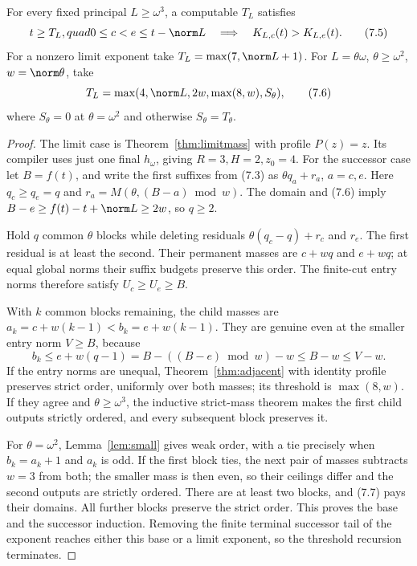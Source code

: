 \documentclass[11pt,a4paper]{article}
\newcommand{\KK}[2]{K_{#1,#2}}
\begin{document}
\begin{theorem}\label{thm:mass}
For every fixed principal $L\ge\omega^3$, a computable $T_L$ satisfies
\[
 t\ge T_L,quad0\le c<e\le t-\norm L
                 \quad\Longrightarrow\quad\KK Lc(t)>\KK Le(t). \tag{7.5}
\]
For a nonzero limit exponent take $T_L=\max(7,\norm L+1)$.
For $L=\theta\omega$, $\theta\ge\omega^2$, $w=\norm\theta$, take
\[
 T_L=\max(4,\norm L,2w,\max(8,w),S_\theta),          \tag{7.6}
\]
where $S_\theta=0$ at $\theta=\omega^2$ and otherwise $S_\theta=T_\theta$.
\end{theorem}
\begin{proof}
The limit case is Theorem~\ref{thm:limitmass} with profile $P(z)=z$.
Its compiler uses just one final $h_\omega$, giving $R=3,H=2,z_0=4$.
For the successor case let $B=f(t)$, and write the first suffixes from
(7.3) as $\theta q_a+r_a$, $a=c,e$. Here $q_c\ge q_e=q$ and
$r_a=M(\theta,(B-a)\bmod w)$. The domain and (7.6) imply
$B-e\ge f(t)-t+\norm L\ge2w$, so $q\ge2$.

Hold $q$ common $\theta$ blocks while deleting residuals
$\theta(q_c-q)+r_c$ and $r_e$. The first residual is at least the
second. Their permanent masses are $c+wq$ and $e+wq$; at equal global
norms their suffix budgets preserve this order. The finite-cut entry
norms therefore satisfy $U_c\ge U_e\ge B$.

With $k$ common blocks remaining, the child masses are
$a_k=c+w(k-1)<b_k=e+w(k-1)$. They are genuine even at the smaller
entry norm $V\ge B$, because
\[
 b_k\le e+w(q-1)=B-((B-e)\bmod w)-w\le B-w\le V-w. \tag{7.7}
\]
If the entry norms are unequal, Theorem~\ref{thm:adjacent} with identity
profile preserves strict order, uniformly over both masses; its threshold
is $\max(8,w)$. If they agree and $\theta\ge\omega^3$, the inductive
strict-mass theorem makes the first child outputs strictly ordered, and
every subsequent block preserves it.

For $\theta=\omega^2$, Lemma~\ref{lem:small} gives weak order, with a
tie precisely when $b_k=a_k+1$ and $a_k$ is odd. If the first block ties,
the next pair of masses subtracts $w=3$ from both; the smaller mass is
then even, so their ceilings differ and the second outputs are strictly
ordered. There are at least two blocks, and (7.7) pays their domains.
All further blocks preserve the strict order. This proves the base and
the successor induction. Removing the finite terminal successor tail of
the exponent reaches either this base or a limit exponent, so the
threshold recursion terminates.
\end{proof}
\end{document}
